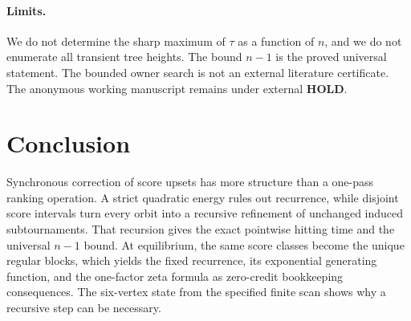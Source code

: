 \documentclass[11pt,a4paper]{amsart}
\theoremstyle{definition}
\theoremstyle{remark}
\begin{document}
\paragraph{Limits.}
We do not determine the sharp maximum of $\tau$ as a function of $n$, and
we do not enumerate all transient tree heights.  The bound $n-1$ is the
proved universal statement.  The bounded owner search is not an external
literature certificate.  The anonymous working manuscript remains under
external \textbf{HOLD}.

\section{Conclusion}

Synchronous correction of score upsets has more structure than a one-pass
ranking operation.  A strict quadratic energy rules out recurrence, while
disjoint score intervals turn every orbit into a recursive refinement of
unchanged induced subtournaments.  That recursion gives the exact
pointwise hitting time and the universal $n-1$ bound.  At equilibrium, the
same score classes become the unique regular blocks, which yields the fixed
recurrence, its exponential generating function, and the one-factor zeta
formula as zero-credit bookkeeping consequences.  The six-vertex state from
the specified finite scan shows why a recursive step can be necessary.



\end{document}
